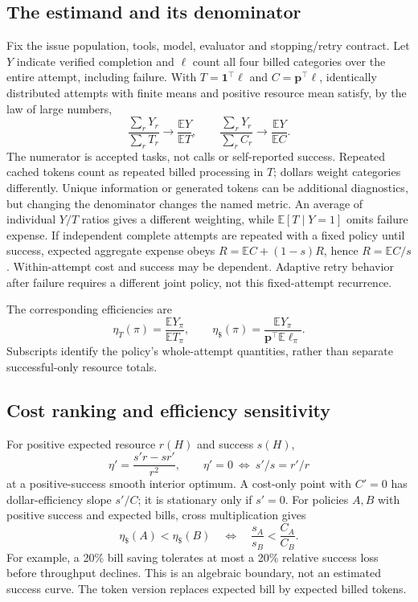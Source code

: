 \documentclass[sigconf,screen,nonacm]{acmart}
\newcommand{\E}{\mathbb{E}}
\newcommand{\pp}{\boldsymbol{p}}
\begin{document}
\subsection{The estimand and its denominator}
Fix the issue population, tools, model, evaluator and stopping/retry
contract. Let $Y$ indicate verified completion and $\boldsymbol\ell$
count all four billed categories over the entire attempt, including
failure. With $T=\mathbf1^\top\boldsymbol\ell$ and
$C=\pp^\top\boldsymbol\ell$, identically distributed attempts with
finite means and positive resource mean satisfy, by the law of large numbers,
\begin{equation}
\frac{\sum_rY_r}{\sum_rT_r}\longrightarrow\frac{\E Y}{\E T},\qquad
\frac{\sum_rY_r}{\sum_rC_r}\longrightarrow\frac{\E Y}{\E C}.
\end{equation}
The numerator is accepted tasks, not calls or self-reported success.
Repeated cached tokens count as repeated billed processing in $T$;
dollars weight categories differently. Unique information or generated
tokens can be additional diagnostics, but changing the denominator
changes the named metric.
An average of individual $Y/T$ ratios gives a different weighting, while
$\E[T\mid Y=1]$ omits failure expense. If independent complete attempts
are repeated with a fixed policy until success, expected aggregate
expense obeys $R=\E C+(1-s)R$, hence $R=\E C/s$.
Within-attempt cost and success may be dependent. Adaptive retry behavior
after failure requires a different joint policy, not this fixed-attempt
recurrence.

The corresponding efficiencies are
\begin{equation}
\eta_T(\pi)=\frac{\E Y_\pi}{\E T_\pi},\qquad
\eta_{\$}(\pi)=\frac{\E Y_\pi}{\pp^\top\E\boldsymbol\ell_\pi}.
\label{eq:task-efficiency}
\end{equation}
Subscripts identify the policy's whole-attempt quantities, rather than
separate successful-only resource totals.

\subsection{Cost ranking and efficiency sensitivity}
For positive expected resource $r(H)$ and success $s(H)$,
\begin{equation}
\eta'=\frac{s'r-sr'}{r^2},\qquad
\eta'=0\ \Longleftrightarrow\ s'/s=r'/r
\end{equation}
at a positive-success smooth interior optimum. A cost-only point with
$C'=0$ has dollar-efficiency slope $s'/C$; it is stationary only if
$s'=0$. For policies $A,B$ with positive success and expected bills,
cross multiplication gives
\begin{equation}
\eta_{\$}(A)<\eta_{\$}(B)
\quad\Longleftrightarrow\quad
\frac{s_A}{s_B}<\frac{C_A}{C_B}.
\label{eq:success-boundary}
\end{equation}
For example, a 20\% bill saving tolerates at most a 20\% relative success
loss before throughput declines. This is an algebraic boundary, not an
estimated success curve. The token version replaces expected bill by
expected billed tokens.
\end{document}
